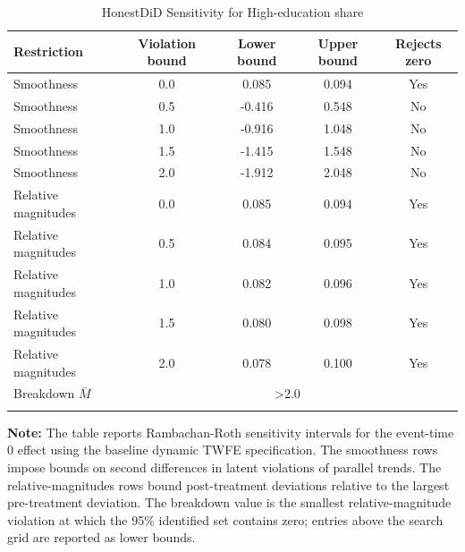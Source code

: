 \begin{table}[htbp]
    \caption{HonestDiD Sensitivity for High-education share}
    \label{tab:honestdid-pct_voters_high_ed}
    \centering
    \small
    \renewcommand{\arraystretch}{1.08}
    \begin{tabular*}{0.94\textwidth}{@{\extracolsep{\fill}}lcccc}
        \doubletoprule
        Restriction & Violation bound & Lower bound & Upper bound & Rejects zero \\
        \midrule
        Smoothness & 0.0 & 0.085 & 0.094 & Yes \\
        Smoothness & 0.5 & -0.416 & 0.548 & No \\
        Smoothness & 1.0 & -0.916 & 1.048 & No \\
        Smoothness & 1.5 & -1.415 & 1.548 & No \\
        Smoothness & 2.0 & -1.912 & 2.048 & No \\
        \midrule
        Relative magnitudes & 0.0 & 0.085 & 0.094 & Yes \\
        Relative magnitudes & 0.5 & 0.084 & 0.095 & Yes \\
        Relative magnitudes & 1.0 & 0.082 & 0.096 & Yes \\
        Relative magnitudes & 1.5 & 0.080 & 0.098 & Yes \\
        Relative magnitudes & 2.0 & 0.078 & 0.100 & Yes \\
        \midrule
        Breakdown $\bar{M}$ & \multicolumn{4}{c}{>2.0} \\
        \doublebottomrule
    \end{tabular*}
    \vspace{1.0em}
    \begin{minipage}{0.94\textwidth}
        {\footnotesize \textbf{Note:} The table reports Rambachan-Roth sensitivity intervals for the event-time $0$ effect using the baseline dynamic TWFE specification. The smoothness rows impose bounds on second differences in latent violations of parallel trends. The relative-magnitudes rows bound post-treatment deviations relative to the largest pre-treatment deviation. The breakdown value is the smallest relative-magnitude violation at which the 95\% identified set contains zero; entries above the search grid are reported as lower bounds. \par}
    \end{minipage}
\end{table}
